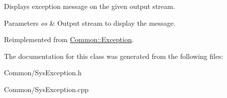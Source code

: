 Displays exception message on the given output stream. 


\begin{DoxyParams}{Parameters}
{\em os} & Output stream to display the message. \\
\hline
\end{DoxyParams}


Reimplemented from \hyperlink{class_common_1_1_exception_a2633eeaab3220268739977a04643a3cf}{Common\-::\-Exception}.



The documentation for this class was generated from the following files\-:\begin{DoxyCompactItemize}
\item 
Common/Sys\-Exception.\-h\item 
Common/Sys\-Exception.\-cpp\end{DoxyCompactItemize}
